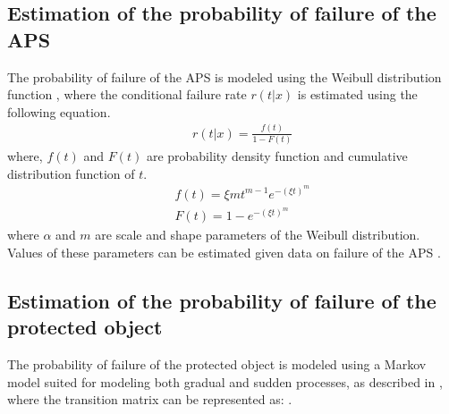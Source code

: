 \documentclass[]{article}
\begin{document}
\subsection{Estimation of the probability of failure of the APS } \label{apsrel}
The probability of failure of the APS is modeled using the Weibull
distribution function \citep{Dodson2006,Kingman1963}, where the conditional failure
rate $r(t|x)$ is estimated using the following equation.
\begin{eqnarray}
 && r(t|x)= \frac{f(t)}{1-F(t)}
\end{eqnarray}
where, $f(t)$ and $F(t)$ are probability density function and cumulative distribution function of $t$.
\begin{eqnarray}
 && f(t)=\xi  m t^{m-1} e^{-(\xi t)^{m}}\label{eq15}\\
 && F(t)=1-e^{-(\xi t)^{m}}\label{eq16}
\end{eqnarray}
where $\alpha$ and $m$ are scale and shape parameters of the Weibull
distribution. Values of these parameters can be estimated given data
on failure of the APS \citep{Dodson2006,Lethanh2013a,Kobayashi2010a}.
%

\subsection{Estimation of the probability of failure of the protected object}

The probability of failure of the protected object is modeled using
a Markov model suited for modeling both gradual and sudden processes,
as described in \citet{Lethanh2015,Fernando2015}, where the transition
matrix can be represented as: .
\end{document}
